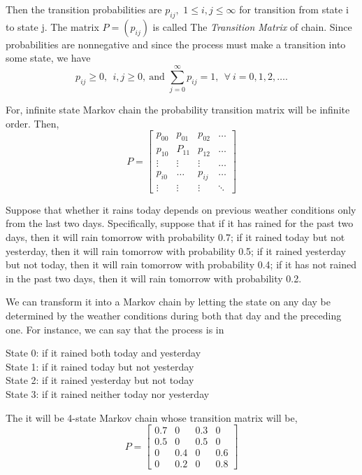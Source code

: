 Then the transition probabilities are $ p_{ij}, $ 
$ 1\le i,j \le \infty $ for transition from state i to state j. The matrix  $ P = (p_{ij}) $ is called The
\textit{Transition Matrix} of chain. Since probabilities are nonnegative and since the process must make a transition into some state, we have
\[
    p_{ij}\ge 0,\ \ i,j\ge 0,\ \text{and } \sum_{j=0}^{\infty}p_{ij} = 1,\ \  \forall\ i=0,1,2,\ldots.
\]

For, infinite state Markov chain the probability transition matrix will be infinite order. 
Then,
\[
    P = 
    \begin{bmatrix}
        p_{00} & p_{01} & p_{02} & \ldots \\
        p_{10} & P_{11} & p_{12} & \ldots \\
        \vdots & \vdots & \vdots & \ldots \\ 
        p_{i0} & \ldots & p_{ij} & \ldots \\
        \vdots & \vdots & \vdots & \ddots 
    \end{bmatrix}
\]

\begin{example}
    Suppose that whether it rains today depends on previous weather conditions only from the last two days. 
    Specifically, suppose that if it has rained for the past two days, 
    then it will rain tomorrow with probability 0.7; 
    if it rained today but not yesterday, then it will rain tomorrow with probability 0.5; 
    if it rained yesterday but not today, then it will rain tomorrow with probability 0.4; 
    if it has not rained in the past two days, then it will rain tomorrow with probability 0.2.
    
    We can transform it into a Markov chain by letting the state on any day be determined by the weather conditions during both that day and 
    the preceding one. For instance, we can say that the process is in

    \begin{center}
        State 0: if it rained both today and yesterday\\ 
        State 1: if it rained today but not yesterday\\ 
        State 2: if it rained yesterday but not today\\ 
        State 3: if it rained neither today nor yesterday 

    \end{center}

    The it will be 4-state Markov chain whose transition matrix will be,
    \[
        P=
        \begin{bmatrix} 
            0.7 & 0 & 0.3 & 0 \\ 
            0.5 & 0 & 0.5 & 0 \\ 
            0 & 0.4 & 0 & 0.6 \\ 
            0 & 0.2 & 0 & 0.8
        \end{bmatrix} 
    \]
\end{example}


